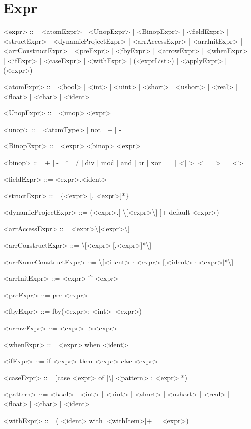 \documentclass{article}
\begin{document}
\section{Expr}
\begin{grammar}

<expr> ::= <atomExpr> | <UnopExpr> | <BinopExpr> | <fieldExpr> | <structExpr> | <dynamicProjectExpr> |
           <arrAccessExpr> | <arrInitExpr> | <arrConstructExpr> | <preExpr> | <fbyExpr> | <arrowExpr> |
           <whenExpr> | <ifExpr> | <caseExpr> | <withExpr> | (<exprList>) | <applyExpr> | (<expr>)

<atomExpr> ::= <bool> | <int> | <uint> | <short> | <ushort> | <real> | <float> | <char> | <ident>

<UnopExpr> ::= <unop> <expr>

<unop> ::= <atomType> | not | + | -

<BinopExpr> ::= <expr> <binop> <expr>

<binop> ::= + | - | * | / | div | mod | and | or | xor | = | \textless | \textgreater | \textless= | \textgreater= | \textless\textgreater

<fieldExpr> ::= <expr>.<ident>

<structExpr> ::= \{<expr> [, <expr>]*\}

<dynamicProjectExpr> ::= (<expr>.[ \textbackslash[<expr>\textbackslash] ]+ default <expr>)

<arrAccessExpr> ::= <expr>\textbackslash[<expr>\textbackslash]

<arrConstructExpr> ::= \textbackslash[<expr> [,<expr>]*\textbackslash]

<arrNameConstructExpr> ::= \textbackslash[<ident> : <expr> [,<ident> : <expr>]*\textbackslash]

<arrInitExpr> ::= <expr> \^{} <expr>

<preExpr> ::= pre <expr>

<fbyExpr> ::= fby(<expr>; <int>; <expr>)

<arrowExpr> ::= <expr> -\textgreater <expr>

<whenExpr> ::= <expr> when <ident>

<ifExpr> ::= if <expr> then <expr> else <expr>

<caseExpr> ::= (case <expr> of [\textbackslash| <pattern> : <expr>]*)

<pattern> ::= <bool> | <int> | <uint> | <short> | <ushort> | <real> | <float> | <char> | <ident> | _

<withExpr> ::= ( <ident> with [<withItem>]+ = <expr>)


\end{grammar}
\end{document}
